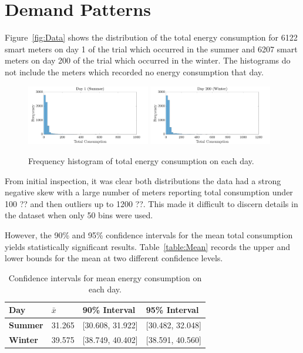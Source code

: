 \documentclass[a4paper,10pt]{article}
\begin{document}
\section{Demand Patterns}

Figure~\vref{fig:Data} shows the distribution of the total energy consumption 
for 6122 smart meters on day 1 of the trial which occurred in the summer and 
6207 smart meters on day 200 of the trial which occurred in the winter. The 
histograms do not include the meters which recorded no energy consumption that 
day.
    
\begin{figure}[h]
    \centering
    \includegraphics[width=0.48\textwidth]{Day1}
    \includegraphics[width=0.48\textwidth]{Day200}
    \caption{Frequency histogram of total energy consumption on each day.}
    \label{fig:Data}
\end{figure}

From initial inspection, it was clear both distributions the data had a strong 
negative skew with a large number of meters reporting total consumption under 
100 ?? and then outliers up to 1200 ??. This made it difficult to discern 
details in the dataset when only 50 bins were used.

However, the 90\% and 95\% confidence intervals for the mean total consumption 
yields statistically significant results. Table~\vref{table:Mean} records the 
upper and lower bounds for the mean at two different confidence levels.

\begin{table}[h]
    \centering
    \begin{tabular}{llll}
        \toprule
        \textbf{Day} & $\bar{x}$ & 90\% Interval & 95\% Interval \\
        \midrule
        \textbf{Summer} & 31.265 & [30.608, 31.922] & [30.482, 32.048] \\
        \textbf{Winter} & 39.575 & [38.749, 40.402] & [38.591, 40.560] \\
        \bottomrule
    \end{tabular}
    \caption{Confidence intervals for mean energy consumption on each day.}
    \label{table:Mean}
\end{table}
\end{document}
